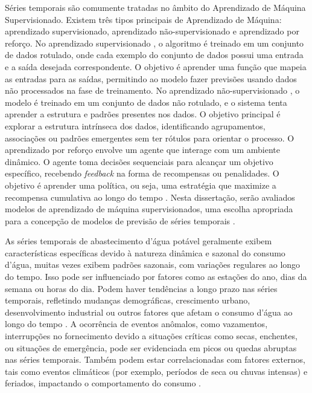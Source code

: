 Séries temporais são comumente tratadas no âmbito do Aprendizado de Máquina Supervisionado. Existem três tipos principais de Aprendizado de Máquina: aprendizado supervisionado, aprendizado não-supervisionado e aprendizado por reforço. No aprendizado supervisionado \cite{LIU2023128730}, o algoritmo é treinado em um conjunto de dados rotulado, onde cada exemplo do conjunto de dados possui uma entrada e a saída desejada correspondente. O objetivo é aprender uma função que mapeia as entradas para as saídas, permitindo ao modelo fazer previsões usando dados não processados na fase de treinamento. No aprendizado não-supervisionado \cite{WANG2022122747}, o modelo é treinado em um conjunto de dados não rotulado, e o sistema tenta aprender a estrutura e padrões presentes nos dados. O objetivo principal é explorar a estrutura intrínseca dos dados, identificando agrupamentos, associações ou padrões emergentes sem ter rótulos para orientar o processo. O aprendizado por reforço \cite{CHEN2023121710} envolve um agente que interage com um ambiente dinâmico. O agente toma decisões sequenciais para alcançar um objetivo específico, recebendo \textit{feedback} na forma de recompensas ou penalidades. O objetivo é aprender uma política, ou seja, uma estratégia que maximize a recompensa cumulativa ao longo do tempo \cite{Silva2021}. Nesta dissertação, serão avaliados modelos de aprendizado de máquina supervisionados, uma escolha apropriada para a concepção de modelos de previsão de séries temporais \cite{UCCASTILLO2023105788}.


As séries temporais de abastecimento d'água potável geralmente exibem características específicas devido à natureza dinâmica e sazonal do consumo d'água, muitas vezes exibem padrões sazonais, com variações regulares ao longo do tempo. Isso pode ser influenciado por fatores como as estações do ano, dias da semana ou horas do dia. Podem haver tendências a longo prazo nas séries temporais, refletindo mudanças demográficas, crescimento urbano, desenvolvimento industrial ou outros fatores que afetam o consumo d'água ao longo do tempo \cite{JI2023129928}. A ocorrência de eventos anômalos, como vazamentos, interrupções no fornecimento devido a situações críticas como secas, enchentes, ou situações de emergência, pode ser evidenciada em picos ou quedas abruptas nas séries temporais. Também podem estar correlacionadas com fatores externos, tais como eventos climáticos (por exemplo, períodos de seca ou chuvas intensas) e feriados, impactando o comportamento do consumo \cite{BERGLUND2023104739}.

